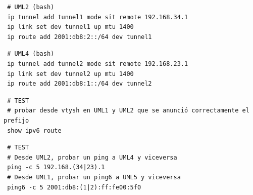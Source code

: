 \documentclass{article}
\begin{document}
\begin{verbatim}
 # UML2 (bash)
 ip tunnel add tunnel1 mode sit remote 192.168.34.1
 ip link set dev tunnel1 up mtu 1400
 ip route add 2001:db8:2::/64 dev tunnel1
\end{verbatim}

\begin{verbatim}
 # UML4 (bash)
 ip tunnel add tunnel2 mode sit remote 192.168.23.1
 ip link set dev tunnel2 up mtu 1400
 ip route add 2001:db8:1::/64 dev tunnel2
\end{verbatim}

\begin{verbatim}
 # TEST
 # probar desde vtysh en UML1 y UML2 que se anunció correctamente el prefijo
 show ipv6 route
\end{verbatim}

\begin{verbatim}
 # TEST
 # Desde UML2, probar un ping a UML4 y viceversa
 ping -c 5 192.168.(34|23).1
 # Desde UML1, probar un ping6 a UML5 y viceversa
 ping6 -c 5 2001:db8:(1|2):ff:fe00:5f0
\end{verbatim}
\end{document}
